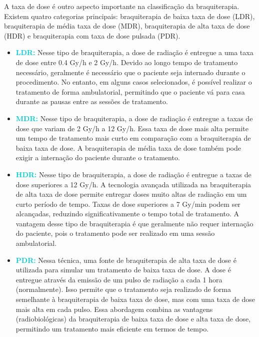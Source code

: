 \documentclass[11pt,a4paper]{article}
\begin{document}
			A taxa de dose é outro aspecto importante na classificação da braquiterapia. Existem quatro categorias principais: braquiterapia de baixa taxa de dose (LDR), braquiterapia de média taxa de dose (MDR), braquiterapia de alta taxa de dose (HDR) e braquiterapia com taxa de dose pulsada (PDR).

			\begin{itemize}
				\item \textcolor{DarkTurquoise}{\textbf{LDR:}}  Nesse tipo de braquiterapia, a dose de radiação é entregue a uma taxa de dose entre 0.4 Gy/h e 2 Gy/h. Devido ao longo tempo de tratamento necessário, geralmente é necessário que o paciente seja internado durante o procedimento. No entanto, em alguns casos selecionados, é possível realizar o tratamento de forma ambulatorial, permitindo que o paciente vá para casa durante as pausas entre as sessões de tratamento.
				
				\item \textcolor{DarkTurquoise}{\textbf{MDR:}} Nesse tipo de braquiterapia, a dose de radiação é entregue a taxas de dose que variam de 2 Gy/h a 12 Gy/h. Essa taxa de dose mais alta permite um tempo de tratamento mais curto em comparação com a braquiterapia de baixa taxa de dose. A braquiterapia de média taxa de dose também pode exigir a internação do paciente durante o tratamento.
				
				\item  \textcolor{DarkTurquoise}{\textbf{HDR:}}  Nesse tipo de braquiterapia, a dose de radiação é entregue a taxas de dose superiores a 12 Gy/h. A tecnologia avançada utilizada na braquiterapia de alta taxa de dose permite entregar doses muito altas de radiação em um curto período de tempo. Taxas de dose superiores a 7 Gy/min podem ser alcançadas, reduzindo significativamente o tempo total de tratamento. A vantagem desse tipo de braquiterapia é que geralmente não requer internação do paciente, pois o tratamento pode ser realizado em uma sessão ambulatorial.
				
				\item \textcolor{DarkTurquoise}{\textbf{PDR:}} Nessa técnica, uma fonte de braquiterapia de alta taxa de dose é utilizada para simular um tratamento de baixa taxa de dose. A dose é entregue através da emissão de um pulso de radiação a cada 1 hora (normalmente). Isso permite que o tratamento seja realizado de forma semelhante à braquiterapia de baixa taxa de dose, mas com uma taxa de dose mais alta em cada pulso. Essa abordagem combina as vantagens (radiobiológicas) da braquiterapia de baixa taxa de dose e alta taxa de dose, permitindo um tratamento mais eficiente em termos de tempo.
			\end{itemize}
\end{document}
